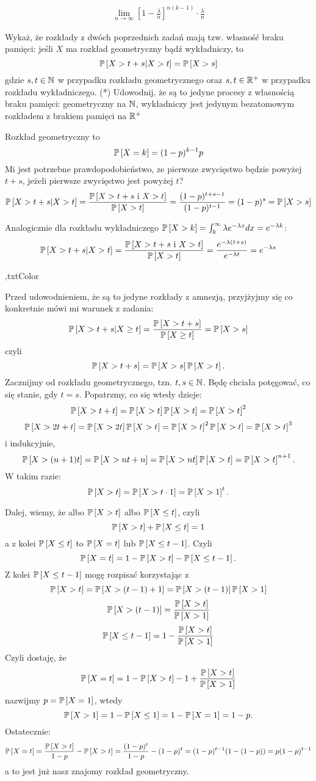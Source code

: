 \documentclass{article}
\begin{document}
\begin{align*}
    \lim_{n\to\infty}\left[1-\frac{\lambda}{n}\right]^{n(k-1)}\cdot\frac{\lambda}{n}
\end{align*}

\begin{problem}[7]{}
Wykaż, że rozkłady z dwóch poprzednich zadań mają tzw. własność braku pamięci: jeśli $X$ ma rozkład geometryczny bądź wykładniczy, to
$$\prob{X>t+s|X>t}=\prob{X>s}$$
gdzie $s,t\in\mathbb{N}$ w przypadku rozkładu geometrycznego oraz $s,t\in\mathbb{R}^+$ w przypadku rozkładu wykładniczego. (*) Udowodnij, że są to jedyne procesy z własnością braku pamięci: geometryczny na $\mathbb{N}$, wykładniczy jest jedynym bezatomowym rozkładem z brakiem pamięci na $\mathbb{R}^+$
\end{problem}

Rozkład geometryczny to
$$\prob{X=k}=(1-p)^{k-1}p$$
Mi jest potrzebne prawdopodobieństwo, ze pierwsze zwycięstwo będzie powyżej $t+s$, jeżeli pierwsze zwycięstwo jest powyżej $t$?
\begin{align*}
    \prob{X>t+s|X> t}=\frac{\prob{X>t+s\text{ i }X> t}}{\prob{X>t}}=\frac{(1-p)^{t+s-1}}{(1-p)^{t-1}}=(1-p)^{s}=\prob{X>s}
\end{align*}

Analogicznie dla rozkładu wykładniczego $\prob{X>k}=\int_k^\infty\lambda e^{-\lambda x}dx=e^{-\lambda k}$:
\begin{align*}
    \prob{X>t+s|X> t}=\frac{\prob{X>t+s\text{ i }X> t}}{\prob{X>t}}=\frac{e^{-\lambda(t+s)}}{ e^{-\lambda t}}=e^{-\lambda s}
\end{align*}

\sep{txtColor}

Przed udowodnieniem, że są to jedyne rozkłady z amnezją, przyjżyjmy się co konkretnie mówi mi warunek z zadania:
$$\prob{X>t+s|X\geq t}=\frac{\prob{X>t+s}}{\prob{X\geq t}}=\prob{X>s}$$
czyli
$$\prob{X>t+s}=\prob{X>s}\prob{X> t}.$$
Zacznijmy od rozkładu geometrycznego, tzn. $t,s\in\mathbb{N}$. Będę chciała potęgować, co się stanie, gdy $t=s$. Popatrzmy, co się wtedy dzieje:
$$\prob{X>t+t}=\prob{X>t}\prob{X> t}=\prob{X>t}^2$$
$$\prob{X>2t+t}=\prob{X>2t}\prob{X>t}=\prob{X>t}^2\prob{X>t}=\prob{X>t}^3$$
i indukcyjnie,
$$\prob{X>(n+1)t}=\prob{X>nt+n}=\prob{X>nt}\prob{X>t}=\prob{X>t}^{n+1}.$$
W takim razie:
$$\prob{X>t}=\prob{X>t\cdot1}=\prob{X>1}^t.$$

Dalej, wiemy, że albo $\prob{X>t}$ albo $\prob{X\leq t}$, czyli
$$\prob{X>t}+\prob{X\leq t}=1$$
a z kolei $\prob{X\leq t}$ to $\prob{X=t}$ lub $\prob{X\leq t-1}$. Czyli
$$\prob{X=t}=1-\prob{X>t}-\prob{X\leq t-1}.$$
Z kolei $\prob{X\leq t-1}$ mogę rozpisać korzystając z 
$$\prob{X>t}=\prob{X>(t-1)+1}=\prob{X>(t-1)}\prob{X>1}$$
$$\prob{X>(t-1)}=\frac{\prob{X>t}}{\prob{X>1}}$$
$$\prob{X\leq t-1}=1-\frac{\prob{X>t}}{\prob{X>1}}$$
Czyli dostaję, że
$$\prob{X=t}=1-\prob{X>t}-1+\frac{\prob{X>t}}{\prob{X>1}}$$
nazwijmy $p=\prob{X=1}$, wtedy 
$$\prob{X>1}=1-\prob{X\leq 1}=1-\prob{X=1}=1-p.$$
Ostatecznie:
$$\prob{X=t}=\frac{\prob{X>t}}{1-p}-\prob{X>t}=\frac{(1-p)^t}{1-p}-(1-p)^t=(1-p)^{t-1}(1-(1-p))=p(1-p)^{t-1}$$
a to jest już nasz znajomy rozkład geometryczny.
\medskip
\end{document}
